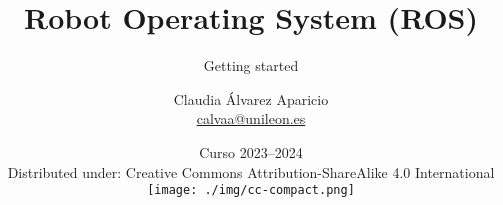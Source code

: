\documentclass[10pt, pdftex, xcolor=dvipsnames, table, aspectratio=1610]{beamer}
\author{Claudia Álvarez Aparicio\texorpdfstring{\\ \url{calvaa@unileon.es}}{}}
\title{Robot Operating System (ROS)}
\subtitle{Getting started}
\institute{\texttt{[image: ./img/robotica-seguridad.png]}\hspace{1cm}\texttt{[image: ./img/ule.png]}\\

\vspace{.2cm}
\textbf{Seguridad en Sistemas Ciberfísicos}}
\date{Curso 2023--2024\\{\tiny Distributed under: Creative Commons Attribution-ShareAlike 4.0 International}\\
\vspace{0,025cm}
\texttt{[image: ./img/cc-compact.png]}}
\begin{document}
\begin{frame}[plain]
  \titlepage
\end{frame}


%
%
%



\begin{frame}[plain]
  \titlepage
\end{frame}
\end{document}
